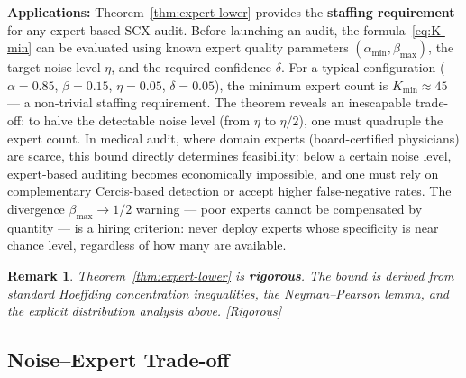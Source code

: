 \documentclass[12pt,a4paper]{article}
\newtheorem{remark}[theorem]{Remark}
\newcommand{\rigorous}{\textcolor{green!50!black}{\small\textsf{[Rigorous]}}}
\begin{document}

\medskip\noindent
\textbf{Applications:}
Theorem~\ref{thm:expert-lower} provides the \textbf{staffing requirement} for
any expert-based SCX audit.  Before launching an audit, the formula~\eqref{eq:K-min}
can be evaluated using known expert quality parameters $(\alpha_{\min},\beta_{\max})$,
the target noise level $\eta$, and the required confidence $\delta$.  For a
typical configuration ($\alpha=0.85$, $\beta=0.15$, $\eta=0.05$, $\delta=0.05$),
the minimum expert count is $K_{\min}\approx 45$ --- a non-trivial staffing
requirement.  The theorem reveals an inescapable trade-off: to halve the
detectable noise level (from $\eta$ to $\eta/2$), one must quadruple the
expert count.  In medical audit, where domain experts (board-certified
physicians) are scarce, this bound directly determines feasibility: below a
certain noise level, expert-based auditing becomes economically impossible,
and one must rely on complementary Cercis-based detection or accept higher
false-negative rates.  The divergence $\beta_{\max}\to1/2$ warning --- poor
experts cannot be compensated by quantity --- is a hiring criterion: never
deploy experts whose specificity is near chance level, regardless of how many
are available.

\begin{remark}
Theorem~\ref{thm:expert-lower} is \textbf{rigorous}.  The bound is derived from
standard Hoeffding concentration inequalities, the Neyman--Pearson lemma, and
the explicit distribution analysis above.  \rigorous
\end{remark}

\subsection{Noise--Expert Trade-off}
\end{document}
